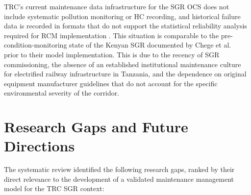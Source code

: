 \documentclass[preprint,12pt,3p]{elsarticle}
\begin{document}
TRC's current maintenance data infrastructure for the SGR OCS
does not include systematic pollution monitoring or HC recording,
and historical failure data is recorded in formats that do not
support the statistical reliability analysis required for RCM
implementation \cite{TRCInspection2025}. This situation is comparable
to the pre-condition-monitoring state of the Kenyan SGR documented
by Chege et al.\ \cite{Chege2019} prior to their model implementation.
This is due to the recency of SGR commissioning, the absence of an
established institutional maintenance culture for electrified railway
infrastructure in Tanzania, and the dependence on original equipment
manufacturer guidelines that do not account for the specific
environmental severity of the corridor.


\section{Research Gaps and Future Directions}
\label{sec:gaps}

The systematic review identified the following research gaps, ranked
by their direct relevance to the development of a validated maintenance
management model for the TRC SGR context:
\end{document}
